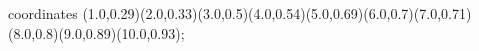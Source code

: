 					coordinates { (1.0,0.29)(2.0,0.33)(3.0,0.5)(4.0,0.54)(5.0,0.69)(6.0,0.7)(7.0,0.71)(8.0,0.8)(9.0,0.89)(10.0,0.93)};